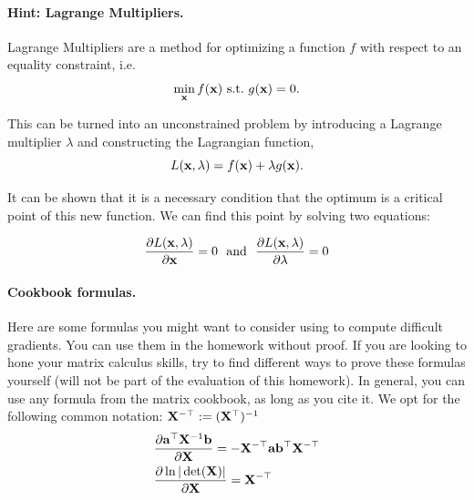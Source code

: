 \documentclass[submit]{harvardml}
\begin{document}
\begin{problem}
\paragraph{Hint: Lagrange Multipliers.} Lagrange Multipliers are a method for
optimizing a function $f$ with respect to an
equality constraint, i.e.
\[\min_{\mathbf{x}} f(\mathbf{x})\ \text{s.t.}\ g(\mathbf{x}) = 0.\]

This can be turned into an unconstrained problem by introducing a
Lagrange multiplier $\lambda$ and constructing the Lagrangian function,
\[L(\mathbf{x}, \lambda) =  f(\mathbf{x}) + \lambda g(\mathbf{x}).\]

It can be shown that it is a necessary condition that the optimum
is a critical point of this new function. We can find this point by solving two equations:

\[\dfrac{\partial L(\mathbf{x}, \lambda)}{\partial  \mathbf{x}} = 0  \ \ \text{and}\  \  \dfrac{\partial L(\mathbf{x}, \lambda)}{\partial \lambda} = 0 \]


\paragraph{Cookbook formulas.} Here are some formulas you might want to consider
using to compute difficult gradients. You can use them  in the homework
without proof. If you are looking to hone your matrix calculus skills, try to
find different ways to prove these formulas yourself (will not be part of the
evaluation of this homework). In general, you can use any formula from the matrix cookbook,
as long as you cite it. We opt for the following common notation:
$\mathbf{X}^{-\top} := (\mathbf{X}^{\top})^{-1}$
\begin{align*}
  & \dfrac{\partial \mathbf{a}^\top \mathbf{X}^{-1} \mathbf{b}}{\partial \mathbf{X}} = - \mathbf{X}^{-\top} \mathbf{a} \mathbf{b}^\top \mathbf{X}^{-\top} \\
  & \dfrac{\partial \ln | \det (\mathbf{X}) |}{\partial \mathbf{X}} = \mathbf{X}^{-\top}
 \end{align*}
 \end{problem}
\end{document}
